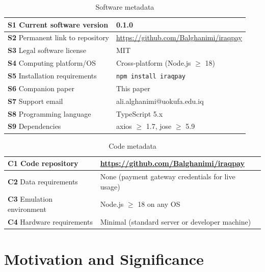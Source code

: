 \documentclass[preprint,12pt]{elsarticle}
\begin{document}
\begin{table}[!h]
\centering
\caption{Software metadata}
\label{tab:software-metadata}
\begin{tabularx}{\textwidth}{|l|X|}
\hline
\textbf{S1} Current software version & 0.1.0 \\
\hline
\textbf{S2} Permanent link to repository & \url{https://github.com/Balghanimi/iraqpay} \\
\hline
\textbf{S3} Legal software license & MIT \\
\hline
\textbf{S4} Computing platform/OS & Cross-platform (Node.js $\geq$ 18) \\
\hline
\textbf{S5} Installation requirements & \texttt{npm install iraqpay} \\
\hline
\textbf{S6} Companion paper & This paper \\
\hline
\textbf{S7} Support email & ali.alghanimi@uokufa.edu.iq \\
\hline
\textbf{S8} Programming language & TypeScript 5.x \\
\hline
\textbf{S9} Dependencies & axios $\geq$ 1.7, jose $\geq$ 5.9 \\
\hline
\end{tabularx}
\end{table}

\begin{table}[!h]
\centering
\caption{Code metadata}
\label{tab:code-metadata}
\begin{tabularx}{\textwidth}{|l|X|}
\hline
\textbf{C1} Code repository & \url{https://github.com/Balghanimi/iraqpay} \\
\hline
\textbf{C2} Data requirements & None (payment gateway credentials for live usage) \\
\hline
\textbf{C3} Emulation environment & Node.js $\geq$ 18 on any OS \\
\hline
\textbf{C4} Hardware requirements & Minimal (standard server or developer machine) \\
\hline
\end{tabularx}
\end{table}

\section{Motivation and Significance}
\label{sec:motivation}
\end{document}
